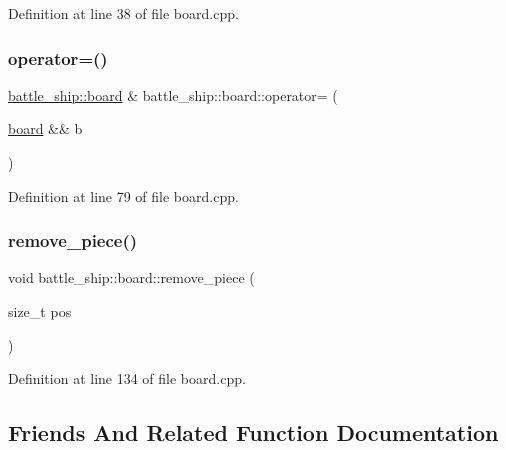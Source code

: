 Definition at line 38 of file board.\+cpp.

\mbox{\label{classbattle__ship_1_1board_ae6dc011dea24157e59e2b3a6f34af586}} 
\subsubsection{\texorpdfstring{operator=()}{operator=()}\hspace{0.1cm}{\footnotesize\ttfamily [2/2]}}
{\footnotesize\ttfamily \hyperlink{classbattle__ship_1_1board}{battle\+\_\+ship\+::board} \& battle\+\_\+ship\+::board\+::operator= (\begin{DoxyParamCaption}\item[{\hyperlink{classbattle__ship_1_1board}{board} \&\&}]{b }\end{DoxyParamCaption})}



Definition at line 79 of file board.\+cpp.

\mbox{\label{classbattle__ship_1_1board_a19d236125f444778e5789109d9c1093b}} 
\subsubsection{\texorpdfstring{remove\+\_\+piece()}{remove\_piece()}}
{\footnotesize\ttfamily void battle\+\_\+ship\+::board\+::remove\+\_\+piece (\begin{DoxyParamCaption}\item[{size\+\_\+t}]{pos }\end{DoxyParamCaption})}



Definition at line 134 of file board.\+cpp.



\subsection{Friends And Related Function Documentation}
\mbox{\label{classbattle__ship_1_1board_a1a31fc970cf43cac6d5b1a44e3831f5d}} 
